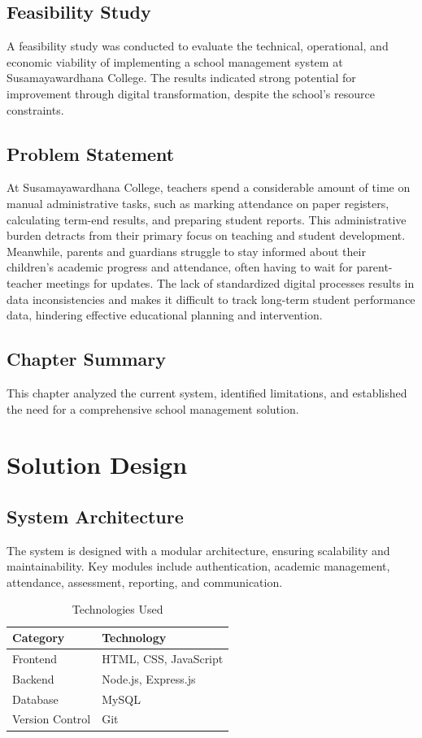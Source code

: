 \documentclass[12pt,a4paper]{report}
\begin{document}
\section{Feasibility Study}
A feasibility study was conducted to evaluate the technical, operational, and economic viability of implementing a school management system at Susamayawardhana College. The results indicated strong potential for improvement through digital transformation, despite the school's resource constraints.

\section{Problem Statement}
At Susamayawardhana College, teachers spend a considerable amount of time on manual administrative tasks, such as marking attendance on paper registers, calculating term-end results, and preparing student reports. This administrative burden detracts from their primary focus on teaching and student development. Meanwhile, parents and guardians struggle to stay informed about their children's academic progress and attendance, often having to wait for parent-teacher meetings for updates. The lack of standardized digital processes results in data inconsistencies and makes it difficult to track long-term student performance data, hindering effective educational planning and intervention.

\section{Chapter Summary}
This chapter analyzed the current system, identified limitations, and established the need for a comprehensive school management solution.

\chapter{Solution Design}
\section{System Architecture}
The system is designed with a modular architecture, ensuring scalability and maintainability. Key modules include authentication, academic management, attendance, assessment, reporting, and communication.

\begin{table}[htbp]
    \centering
    \caption{Technologies Used}
    \label{tab:tech-stack}
    \begin{tabular}{ll}
        \toprule
        Category & Technology \\
        \midrule
        Frontend & HTML, CSS, JavaScript \\
        Backend & Node.js, Express.js \\
        Database & MySQL \\
        Version Control & Git \\
        \bottomrule
    \end{tabular}
\end{table}
\end{document}
